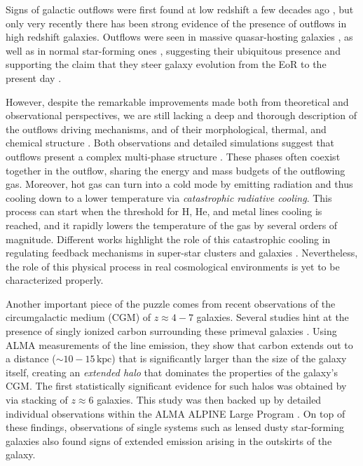 \documentclass[a4paper, 12pt]{article}
\begin{document}
Signs of galactic outflows were first found at low redshift a few decades ago \citep{chevalier_clegg:1985, Walter:2002vq}, but only very recently there has been strong evidence of the presence of outflows in high redshift galaxies. Outflows were seen in massive quasar-hosting galaxies \citep{cicone2015}, as well as in normal star-forming ones \citep{gallerani:2018, ginolfi:2019, Sugahara19, herrera2021kiloparsec}, suggesting their ubiquitous presence and supporting the claim that they steer galaxy evolution from the EoR to the present day \citep{veilleux2020cool}. 

However, despite the remarkable improvements made both from theoretical and observational perspectives, we are still lacking a deep and thorough description of the outflows driving mechanisms, and of their morphological, thermal, and chemical structure \citep{heckman2017galactic}. Both observations and detailed simulations suggest that outflows present a complex multi-phase structure \citep{murray2011, hopkins2014, muratov2015,pandya2021characterizing}. These phases often coexist together in the outflow, sharing the energy and mass budgets of the outflowing gas. Moreover, hot gas can turn into a cold mode by emitting radiation and thus cooling down to a lower temperature via \textit{catastrophic radiative cooling}. This process can start when the threshold for H, He, and metal lines cooling is reached, and it rapidly lowers the temperature of the gas by several orders of magnitude. Different works highlight the role of this catastrophic cooling in regulating feedback mechanisms in super-star clusters \citep{Silich:2004,gray2019catastrophic} and galaxies \citep{Wang:1995, sarkar:2015, Thompson16, Schneider:2018, Gronke&Oh:2020}. Nevertheless, the role of this physical process in real cosmological environments is yet to be characterized properly.

Another important piece of the puzzle comes from recent observations of the circumgalactic medium (CGM) of $z\approx4-7$ galaxies. Several studies hint at the presence of singly ionized carbon surrounding these primeval galaxies \citep{Fujimoto19, Fujimoto:2020qzo, ginolfi:2019, herrera2021kiloparsec}. Using ALMA measurements of the \CII line emission, they show that carbon extends out to a distance ($\sim 10-15 \,\mathrm{kpc}$) that is significantly larger than the size of the galaxy itself, creating an \textit{extended halo} that dominates the properties of the galaxy's CGM. The first statistically significant evidence for such halos was obtained by \citet{Fujimoto19} via stacking of $z\approx6$ galaxies. This study was then backed up by detailed individual observations within the ALMA ALPINE Large Program \citep[][]{lefevre:2019, Fujimoto:2020qzo}. On top of these findings, observations of single systems such as lensed dusty star-forming galaxies \citep{Rybak20} also found signs of extended \CII emission arising in the outskirts of the galaxy. 
\end{document}
